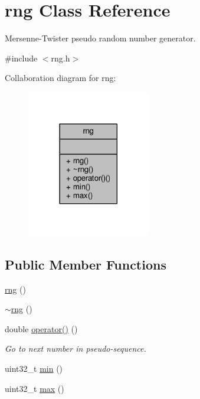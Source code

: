 \hypertarget{classrng}{}\section{rng Class Reference}
\label{classrng}


Mersenne-\/\+Twister pseudo random number generator.  




{\ttfamily \#include $<$rng.\+h$>$}



Collaboration diagram for rng\+:
\nopagebreak
\begin{figure}[H]
\begin{center}
\leavevmode
\includegraphics[width=153pt]{classrng__coll__graph}
\end{center}
\end{figure}
\subsection*{Public Member Functions}
\begin{DoxyCompactItemize}
\item 
\hyperlink{classrng_a42a6b92cac3b2a289f8d21fe8cfe6101}{rng} ()
\item 
\hyperlink{classrng_a6fca2df7036b5f2f76b9b642523f5d19}{$\sim$rng} ()
\item 
double \hyperlink{classrng_a58c53a0d8e075b75c4d1eb4d4af5fe7f}{operator()} ()
\begin{DoxyCompactList}\small\item\em Go to next number in pseudo-\/sequence. \end{DoxyCompactList}\item 
uint32\+\_\+t \hyperlink{classrng_a2619e124008ebc19fef93983f50eaf50}{min} ()
\item 
uint32\+\_\+t \hyperlink{classrng_aea990d0e1df0fc4a5850d7a3dedee633}{max} ()
\end{DoxyCompactItemize}


